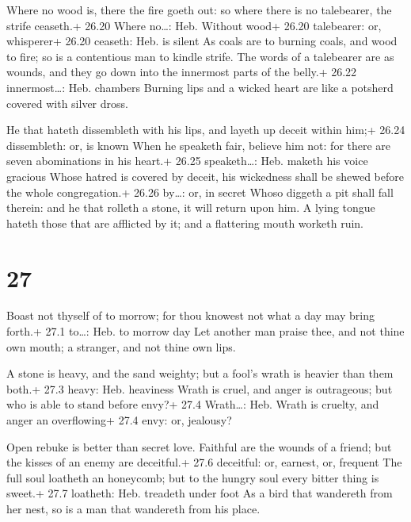  Where no wood is, there the fire goeth out: so where there
is no talebearer, the strife ceaseth.+ 26.20 Where no\ldots: Heb.
Without wood+ 26.20 talebearer: or, whisperer+ 26.20 ceaseth: Heb. is
silent  As coals are to burning coals, and wood to fire; so
is a contentious man to kindle strife.  The words of a
talebearer are as wounds, and they go down into the innermost parts of
the belly.+ 26.22 innermost\ldots: Heb. chambers  Burning
lips and a wicked heart are like a potsherd covered with silver dross.

 He that hateth dissembleth with his lips, and layeth up
deceit within him;+ 26.24 dissembleth: or, is known  When
he speaketh fair, believe him not: for there are seven abominations in
his heart.+ 26.25 speaketh\ldots: Heb. maketh his voice gracious
 Whose hatred is covered by deceit, his wickedness shall be
shewed before the whole congregation.+ 26.26 by\ldots: or, in secret
 Whoso diggeth a pit shall fall therein: and he that
rolleth a stone, it will return upon him.  A lying tongue
hateth those that are afflicted by it; and a flattering mouth worketh
ruin.

\hypertarget{section-26}{%
\section{27}\label{section-26}}

 Boast not thyself of to morrow; for thou knowest not what a
day may bring forth.+ 27.1 to\ldots: Heb. to morrow day  Let
another man praise thee, and not thine own mouth; a stranger, and not
thine own lips.

 A stone is heavy, and the sand weighty; but a fool's wrath
is heavier than them both.+ 27.3 heavy: Heb. heaviness 
Wrath is cruel, and anger is outrageous; but who is able to stand before
envy?+ 27.4 Wrath\ldots: Heb. Wrath is cruelty, and anger an
overflowing+ 27.4 envy: or, jealousy?

 Open rebuke is better than secret love. 
Faithful are the wounds of a friend; but the kisses of an enemy are
deceitful.+ 27.6 deceitful: or, earnest, or, frequent  The
full soul loatheth an honeycomb; but to the hungry soul every bitter
thing is sweet.+ 27.7 loatheth: Heb. treadeth under foot  As
a bird that wandereth from her nest, so is a man that wandereth from his
place.

